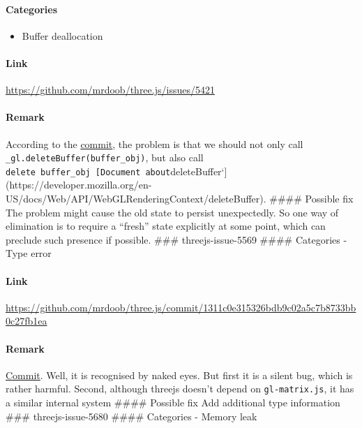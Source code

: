 \paragraph{Categories}\label{categories-2}

\begin{itemize}
\tightlist
\item
  Buffer deallocation
\end{itemize}

\paragraph{Link}\label{link-8}

\url{https://github.com/mrdoob/three.js/issues/5421}

\paragraph{Remark}\label{remark-8}

According to the
\href{https://github.com/mrdoob/three.js/commit/70ca93c2fe184795e5410a6b30e625dee43af870}{commit},
the problem is that we should not only call
\texttt{\_gl.deleteBuffer(buffer\_obj)}, but also call
\texttt{delete\ buffer\_obj\ {[}Document\ about}deleteBuffer`{]}(https://developer.mozilla.org/en-US/docs/Web/API/WebGLRenderingContext/deleteBuffer).
\#\#\#\# Possible fix The problem might cause the old state to persist
unexpectedly. So one way of elimination is to require a ``fresh'' state
explicitly at some point, which can preclude such presence if possible.
\#\#\# threejs-issue-5569 \#\#\#\# Categories - Type error

\paragraph{Link}\label{link-9}

\url{https://github.com/mrdoob/three.js/commit/1311c0e315326bdb9c02a5c7b8733bb0c27fb1ea}

\paragraph{Remark}\label{remark-9}

\href{https://github.com/mrdoob/three.js/commit/1311c0e315326bdb9c02a5c7b8733bb0c27fb1ea}{Commit}.
Well, it is recognised by naked eyes. But first it is a silent bug,
which is rather harmful. Second, although threejs doesn't depend on
\texttt{gl-matrix.js}, it has a similar internal system \#\#\#\#
Possible fix Add additional type information \#\#\# threejs-issue-5680
\#\#\#\# Categories - Memory leak

